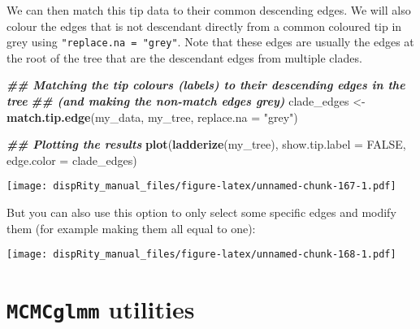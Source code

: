 \documentclass[
]{book}
\newenvironment{Shaded}{\begin{snugshade}}{\end{snugshade}}
\newcommand{\AttributeTok}[1]{\textcolor[rgb]{0.13,0.29,0.53}{#1}}
\newcommand{\ConstantTok}[1]{\textcolor[rgb]{0.56,0.35,0.01}{#1}}
\newcommand{\DecValTok}[1]{\textcolor[rgb]{0.00,0.00,0.81}{#1}}
\newcommand{\DocumentationTok}[1]{\textcolor[rgb]{0.56,0.35,0.01}{\textbf{\textit{#1}}}}
\newcommand{\FunctionTok}[1]{\textcolor[rgb]{0.13,0.29,0.53}{\textbf{#1}}}
\newcommand{\NormalTok}[1]{#1}
\newcommand{\OtherTok}[1]{\textcolor[rgb]{0.56,0.35,0.01}{#1}}
\newcommand{\SpecialCharTok}[1]{\textcolor[rgb]{0.81,0.36,0.00}{\textbf{#1}}}
\newcommand{\StringTok}[1]{\textcolor[rgb]{0.31,0.60,0.02}{#1}}
\begin{document}
We can then match this tip data to their common descending edges.
We will also colour the edges that is not descendant directly from a common coloured tip in grey using \texttt{"replace.na\ =\ "grey"}.
Note that these edges are usually the edges at the root of the tree that are the descendant edges from multiple clades.

\begin{Shaded}
\begin{Highlighting}[]
\DocumentationTok{\#\# Matching the tip colours (labels) to their descending edges in the tree}
\DocumentationTok{\#\# (and making the non{-}match edges grey)}
\NormalTok{clade\_edges }\OtherTok{\textless{}{-}} \FunctionTok{match.tip.edge}\NormalTok{(my\_data, my\_tree, }\AttributeTok{replace.na =} \StringTok{"grey"}\NormalTok{)}

\DocumentationTok{\#\# Plotting the results}
\FunctionTok{plot}\NormalTok{(}\FunctionTok{ladderize}\NormalTok{(my\_tree), }\AttributeTok{show.tip.label =} \ConstantTok{FALSE}\NormalTok{, }\AttributeTok{edge.color =}\NormalTok{ clade\_edges)}
\end{Highlighting}
\end{Shaded}

\texttt{[image: dispRity\_manual\_files/figure-latex/unnamed-chunk-167-1.pdf]}

But you can also use this option to only select some specific edges and modify them (for example making them all equal to one):

\begin{Shaded}
\end{Shaded}

\texttt{[image: dispRity\_manual\_files/figure-latex/unnamed-chunk-168-1.pdf]}

\hypertarget{MCMCglmm-utilities}{%
\section{\texorpdfstring{\texttt{MCMCglmm} utilities}{MCMCglmm utilities}}\label{MCMCglmm-utilities}}
\end{document}

